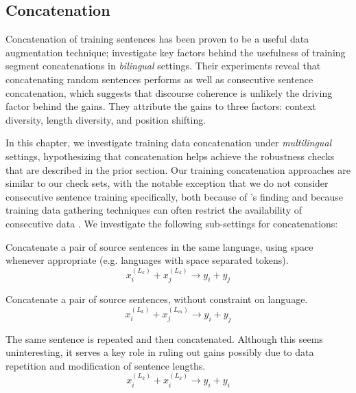 \subsection{Concatenation}
Concatenation of training sentences has been proven to be a useful data augmentation technique; \citet{nguyen-etal-2021-data} investigate key factors behind the usefulness of training segment concatenations in \textit{bilingual} settings. 
Their experiments reveal that concatenating random sentences performs as well as consecutive sentence concatenation, which suggests that discourse coherence is unlikely the driving factor behind the gains.
They attribute the gains to three factors: context diversity, length diversity, and position shifting.

In this chapter, we investigate training data concatenation under \textit{multilingual} settings, hypothesizing that concatenation helps achieve the robustness checks that are described in the prior section. Our training concatenation approaches are similar to our check sets, with the notable exception that we do not consider consecutive sentence training specifically, both because of \citet{nguyen-etal-2021-data}'s finding and because training data gathering techniques can often restrict the availability of consecutive data \cite{banon-etal-2020-paracrawl}.  
We investigate the following sub-settings for concatenations:

\begin{description}[itemsep=0.5mm,topsep=0pt,leftmargin=5mm]
\item[CatSL:] Concatenate a pair of source sentences in the same language, using space whenever appropriate (e.g. languages with space separated tokens). 
$$x^{(L_k)}_i + x^{(L_k)}_j \rightarrow y_i + y_j$$

\item[CatXL:] Concatenate a pair of source sentences, without constraint on language.
$$x^{(L_k)}_i + x^{(L_m)}_j \rightarrow y_i + y_j$$
\item[CatRepeat:] The same sentence is repeated and then concatenated. 
Although this seems uninteresting, it serves a key role in ruling out gains possibly due to data repetition and modification of sentence lengths.
 $$x^{(L_k)}_i + x^{(L_k)}_i \rightarrow y_i + y_i$$
\end{description}

